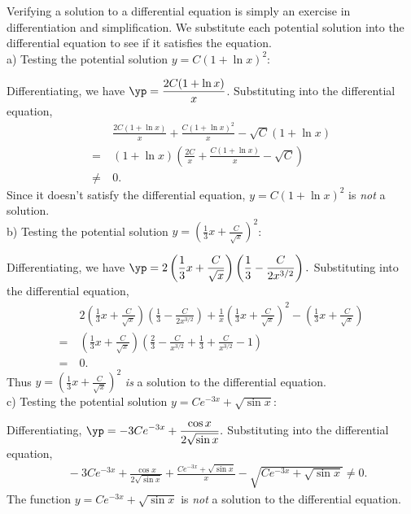 {Verifying a solution to a differential equation is simply an exercise in differentiation and simplification.  We substitute each potential solution into the differential equation to see if it satisfies the equation.\\

\noindent a) Testing the potential solution $y = C \left ( 1 + \ln x \right )^2$:

Differentiating, we have $\displaystyle \yp = \frac{2C(1 + \ln x)}{x}$.  Substituting into the differential equation,
\begin{align*}
&\ \frac{2C(1+\ln x)}{x} + \frac{C(1+\ln x)^2}{x} -\sqrt{C}(1+\ln x)\\
=&\ (1+\ln x)\left( \frac{2C}{x} + \frac{C(1+\ln x)}{x} - \sqrt{C}\right)\\
 \neq &\ 0.
\end{align*}
Since it doesn't satisfy the differential equation, $y = C(1 + \ln x)^2$ is \emph{not} a solution.\\

\noindent b) Testing the potential solution $\displaystyle y = \left ( \frac{1}{3}x + \frac{C}{\sqrt{x}} \right )^2$:

Differentiating, we have $\displaystyle \yp = 2\left ( \frac{1}{3}x + \frac{C}{\sqrt{x}} \right )\left ( \frac{1}{3} - \frac{C}{2x^{3/2}}\right ).$ Substituting into the differential equation,
\begin{align*}
&\ 2\left ( \frac{1}{3}x + \frac{C}{\sqrt{x}} \right )\left ( \frac{1}{3} - \frac{C}{2x^{3/2}}\right ) + \frac{1}{x}\left ( \frac{1}{3}x + \frac{C}{\sqrt{x}} \right )^2 - \left (\frac{1}{3}x + \frac{C}{\sqrt{x}}\right) \\
=&\ \left ( \frac{1}{3}x + \frac{C}{\sqrt{x}} \right ) \left ( \frac{2}{3} - \frac{C}{x^{3/2}} + \frac{1}{3} + \frac{C}{x^{3/2}} - 1 \right )\\
=&\ 0.
\end{align*}
Thus  $\displaystyle y = \left ( \frac{1}{3}x + \frac{C}{\sqrt{x}} \right )^2$ \emph{is} a solution to the differential equation.\\

\noindent c) Testing the potential solution $\displaystyle y = C e^{-3x} + \sqrt{\sin x}$:

Differentiating, $\displaystyle \yp = -3Ce^{-3x} + \frac{\cos x}{2\sqrt{\sin x}}.$ Substituting into the differential equation,
\begin{align*}
&\ -3Ce^{-3x} + \frac{\cos x}{2\sqrt{\sin x}} + \frac{C e^{-3x} + \sqrt{\sin x}}{x} - \sqrt{C e^{-3x} + \sqrt{\sin x}} \neq 0.
\end{align*}
The function $\displaystyle y = C e^{-3x} + \sqrt{\sin x}$ is \emph{not} a solution to the differential equation.
}\\

